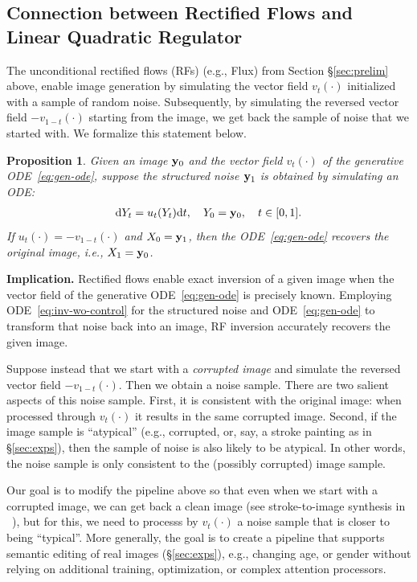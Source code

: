 \documentclass{article} %
\theoremstyle{plain}
\newtheorem{proposition}[theorem]{Proposition}
\newcommand{\deriv}{\mathrm{d}}
\begin{document}
\subsection{Connection between Rectified Flows and Linear Quadratic Regulator}
\label{sec:rf-lqr}
The unconditional rectified flows (RFs) (e.g., Flux) from Section \S\ref{sec:prelim} above, enable image generation by simulating the vector field $v_t(\cdot)$ initialized with a sample of random noise. Subsequently, by simulating the reversed vector field $-v_{1-t}(\cdot)$ starting from the image, we get back the sample of noise that we started with.  We formalize this statement below.
\begin{proposition}
\label{prop:inv-wo-control}
Given an image ${\mathbf{y}}_0$ and the vector field $v_t(\cdot)$ of the generative ODE~\eqref{eq:gen-ode}, suppose the structured noise ${\mathbf{y}}_1$ is obtained by simulating an ODE:
\begin{align}
\label{eq:inv-wo-control}
    \deriv Y_t = u_t(Y_t) \deriv t, \quad Y_0 = \rvy_0, \quad t\in[0,1]. 
\end{align} 
If $u_t(\cdot) = -v_{1-t}(\cdot)$ and $X_0 = {\mathbf{y}}_1$, then the ODE~\eqref{eq:gen-ode} recovers the original image, i.e., $X_1 = {\mathbf{y}}_0$.
\end{proposition}

\noindent\textbf{Implication.} Rectified flows enable exact inversion of a given image when the vector field of the generative ODE~\eqref{eq:gen-ode} is precisely known. 
Employing ODE~\eqref{eq:inv-wo-control} for the structured noise and ODE~\eqref{eq:gen-ode} to transform that noise back into an image, RF inversion accurately recovers the given image.


Suppose instead that we start with a {\em corrupted image} and simulate the reversed vector field $-v_{1-t}(\cdot)$. Then we obtain a noise sample. There are two salient aspects of this noise sample. First, it is consistent with the original image: when processed through $v_{t}(\cdot)$ it results in the same corrupted image. Second, if the image sample is ``atypical'' (e.g., corrupted, or, say, a stroke painting as in \S\ref{sec:exps}), then the sample of noise is also likely to be atypical. In other words, the noise sample is only consistent to the (possibly corrupted) image sample.

Our goal is to modify the pipeline above so that even when we start with a corrupted image, we can get back a clean image  (see stroke-to-image synthesis in ~), but for this, we need to processs by $v_{t}(\cdot)$  a noise sample that is closer to being ``typical''.
More generally, the goal is to create a pipeline that supports semantic editing of real images (\S\ref{sec:exps}), e.g., changing age, or gender without relying on additional training, optimization, or complex attention processors.
\end{document}
